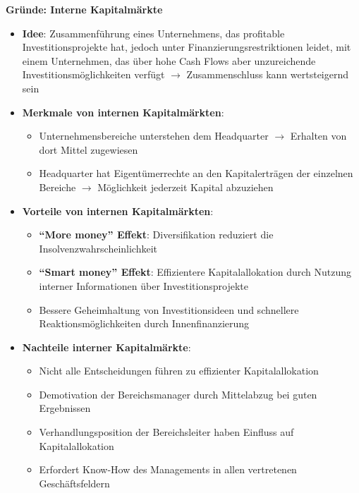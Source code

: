\textbf{Gründe: Interne Kapitalmärkte}
\begin{itemize}
	\item \textbf{Idee}: Zusammenführung eines Unternehmens, das profitable Investitionsprojekte hat, jedoch unter Finanzierungsrestriktionen leidet, mit einem Unternehmen, das über hohe Cash Flows aber unzureichende Investitionsmöglichkeiten verfügt $\rightarrow$ Zusammenschluss kann wertsteigernd sein
	\item \textbf{Merkmale von internen Kapitalmärkten}:
	\begin{itemize}
		\item Unternehmensbereiche unterstehen dem Headquarter $\rightarrow$ Erhalten von dort Mittel zugewiesen
		\item Headquarter hat Eigentümerrechte an den Kapitalerträgen der einzelnen Bereiche $\rightarrow$ Möglichkeit jederzeit Kapital abzuziehen
	\end{itemize}
	\item \textbf{Vorteile von internen Kapitalmärkten}:
	\begin{itemize}
		\item \textbf{\enquote{More money} Effekt}: Diversifikation reduziert die Insolvenzwahrscheinlichkeit 
		\item \textbf{\enquote{Smart money} Effekt}: Effizientere Kapitalallokation durch Nutzung interner Informationen über Investitionsprojekte
		\item Bessere Geheimhaltung von Investitionsideen und schnellere Reaktionsmöglichkeiten durch Innenfinanzierung
	\end{itemize}
	\item \textbf{Nachteile interner Kapitalmärkte}:
	\begin{itemize}
		\item Nicht alle Entscheidungen führen zu effizienter Kapitalallokation
		\item Demotivation der Bereichsmanager durch Mittelabzug bei guten Ergebnissen
		\item Verhandlungsposition der Bereichsleiter haben Einfluss auf Kapitalallokation
		\item Erfordert Know-How des Managements in allen vertretenen Geschäftsfeldern
	\end{itemize}
\end{itemize}

